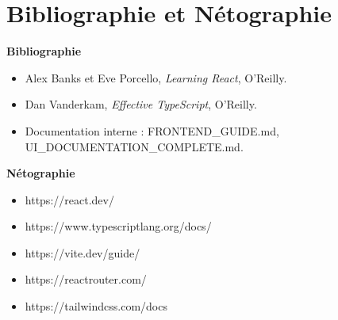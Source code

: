 \chapter*{Bibliographie et Nétographie}

\textbf{Bibliographie}
\begin{itemize}
  \item [1] Alex Banks et Eve Porcello, \textit{Learning React}, O'Reilly.
  \item [2] Dan Vanderkam, \textit{Effective TypeScript}, O'Reilly.
  \item [3] Documentation interne : FRONTEND\_GUIDE.md, UI\_DOCUMENTATION\_COMPLETE.md.
\end{itemize}

\textbf{Nétographie}
\begin{itemize}
  \item https://react.dev/
  \item https://www.typescriptlang.org/docs/
  \item https://vite.dev/guide/
  \item https://reactrouter.com/
  \item https://tailwindcss.com/docs
\end{itemize}
